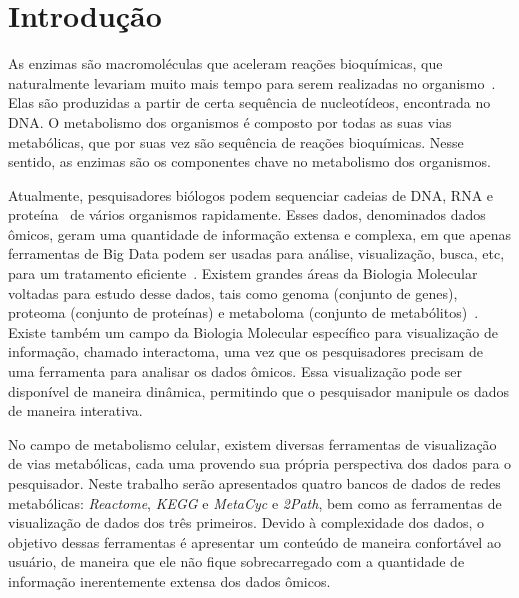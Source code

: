 \chapter{Introdução}



\indent As enzimas são macromoléculas que aceleram reações bioquímicas, que naturalmente levariam muito mais tempo para serem realizadas no organismo~\cite{setubal97}. Elas são produzidas a partir de certa sequência de nucleotídeos, encontrada no DNA. O metabolismo dos organismos é composto por todas as suas vias metabólicas, que por suas vez são sequência de reações bioquímicas. Nesse sentido, as enzimas são os componentes chave no metabolismo dos organismos.

\indent Atualmente, pesquisadores biólogos podem sequenciar cadeias de DNA, RNA e proteína~\cite{mount01} de vários organismos rapidamente. Esses dados, denominados dados ômicos, geram uma quantidade de informação extensa e complexa, em que apenas ferramentas de Big Data podem ser usadas para análise, visualização, busca, etc, para um tratamento eficiente~\cite{berger13}. Existem grandes áreas da Biologia Molecular voltadas para estudo desse dados, tais como genoma (conjunto de genes), proteoma (conjunto de proteínas) e metaboloma (conjunto de metabólitos)~\cite{berger13}. Existe também um campo da Biologia Molecular específico para visualização de informação, chamado interactoma, uma vez que os pesquisadores precisam de uma ferramenta para analisar os dados ômicos. Essa visualização pode ser disponível de maneira dinâmica, permitindo que o pesquisador manipule os dados de maneira interativa. 

\indent No campo de metabolismo celular, existem diversas ferramentas de visualização de vias metabólicas, cada uma provendo sua própria perspectiva dos dados para o pesquisador. Neste trabalho serão apresentados quatro bancos de dados de redes metabólicas: \textit{Reactome}, \textit{KEGG} e \textit{MetaCyc} e \textit{2Path}, bem como as ferramentas de visualização de dados dos três primeiros. Devido à complexidade dos dados, o objetivo dessas ferramentas é apresentar um conteúdo de maneira confortável ao usuário, de maneira que ele não fique sobrecarregado com a quantidade de informação inerentemente extensa dos dados ômicos.

